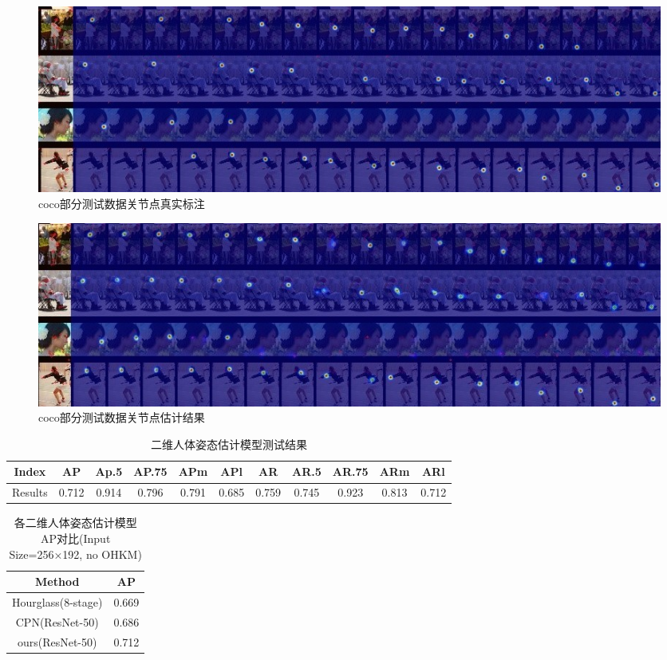 \begin{figure}[h]
	\centering
	\includegraphics[scale=0.8]{figures/21.jpg}
	\caption{coco部分测试数据关节点真实标注}
	\label{fig:f21}
\end{figure}

\begin{figure}[h]
	\centering
	\includegraphics[scale=0.8]{figures/22.jpg}
	\caption{coco部分测试数据关节点估计结果}
	\label{fig:f22}
\end{figure}

\begin{table}[h]
    \caption{\label{tab:t1}二维人体姿态估计模型测试结果}
    \centering
    \begin{tabular}{c c c c c c c c c c c}
        \toprule
        Index	   & AP	    & Ap.5	    & AP.75	    & APm	    & APl	    & AR	    & AR.5	    & AR.75	    & ARm	    & ARl   \\
        \midrule
        Results   & 0.712	& 0.914	    & 0.796     & 0.791	    & 0.685	    & 0.759	    & 0.745	    & 0.923	    & 0.813	    & 0.712   \\
        \bottomrule
    \end{tabular}
\end{table}

\begin{table}[h]
    \caption{\label{tab:t2}各二维人体姿态估计模型AP对比(Input Size=256×192, no OHKM)}
    \centering
    \begin{tabular}{c c}
        \toprule
        Method	   & AP	 \\
        \midrule
        Hourglass(8-stage)	& 0.669 \\
        CPN(ResNet-50)	    & 0.686 \\
        ours(ResNet-50)	    & 0.712 \\
        \bottomrule
    \end{tabular}
\end{table}